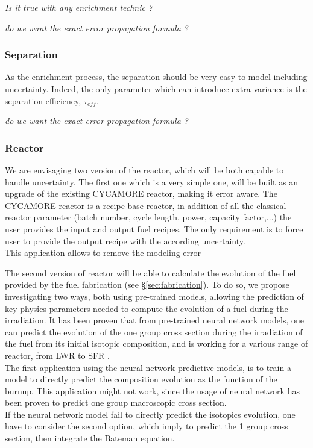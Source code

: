\documentclass[dvips,12pt]{article}
\begin{document}
\textit{Is it true with any enrichment technic ?}

\textit{do we want the exact error propagation formula ?}

\subsubsection{Separation}
As the enrichment process, the separation should be very easy to model including uncertainty. Indeed, the only parameter which can introduce extra variance is the separation efficiency, $\tau_{eff}$.%

\textit{do we want the exact error propagation formula ?}

\subsubsection{Reactor}
We are envisaging two version of the reactor, which will be both capable to handle uncertainty.
The first one which is a very simple one,  will be built as an upgrade of the existing CYCAMORE reactor, making it error aware. The CYCAMORE reactor is a recipe base reactor, in addition of all the classical reactor parameter (batch number, cycle length, power, capacity factor,...) the user provides the input and output fuel recipes. The only requirement is to force user to provide the output recipe with the according uncertainty.\\
This application allows to remove the modeling error

The second version of reactor will be able to calculate the evolution of the fuel provided by the fuel fabrication (see \S \ref{sec:fabrication}).
To do so, we propose investigating two ways, both using pre-trained models, allowing the prediction of key physics parameters needed to compute the evolution of a fuel during the irradiation. It has been proven that from pre-trained neural network models, one can predict the evolution of the one group cross section during the irradiation of the fuel from its initial isotopic composition, and is working for a various range of reactor, from LWR to SFR \cite{Leniau Neural networks, Leniau.PHYSOR.2016}.\\
The first application using the neural network predictive models, is to train a model to directly predict the composition evolution as the function of the burnup. This application might not work, since the usage of neural network has been proven to predict one group macroscopic cross section.\\
If the neural network model fail to directly predict the isotopics evolution, one have to consider the second option, which imply to predict the 1 group cross section, then integrate the Bateman equation.\\
\end{document}
